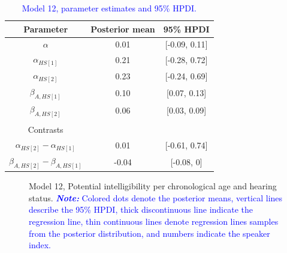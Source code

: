 \documentclass[
  authoryear,
  preprint,
  1p]{elsarticle}
\begin{document}
\begin{longtable}[]{@{}ccc@{}}

\caption{\label{tbl-parameter-model12}\textcolor{blue}{Model 12, parameter estimates and
95\% HPDI.}}

\tabularnewline

\toprule\noalign{}
Parameter & Posterior mean & 95\% HPDI \\
\midrule\noalign{}
\endhead
\bottomrule\noalign{}
\endlastfoot
\(\alpha\) & 0.01 & {[}-0.09, 0.11{]} \\
\(\alpha_{HS[1]}\) & 0.21 & {[}-0.28, 0.72{]} \\
\(\alpha_{HS[2]}\) & 0.23 & {[}-0.24, 0.69{]} \\
\(\beta_{A,HS[1]}\) & 0.10 & {[}0.07, 0.13{]} \\
\(\beta_{A,HS[2]}\) & 0.06 & {[}0.03, 0.09{]} \\
& & \\
Contrasts & & \\
\(\alpha_{HS[2]} - \alpha_{HS[1]}\) & 0.01 & {[}-0.61, 0.74{]} \\
\(\beta_{A,HS[2]} - \beta_{A,HS[1]}\) & -0.04 & {[}-0.08, 0{]} \\

\end{longtable}

\label{cell-fig-rq3-intelligibility-model12}
\begin{figure}[H]


\caption{\label{fig-rq3-intelligibility-model12}Model 12, Potential
intelligibility per chronological age and hearing status.
\textcolor{blue}{\textbf{\emph{Note:}} Colored dots denote the posterior means, vertical
lines describe the 95\% HPDI, thick discontinuous line indicate the
regression line, thin continuous lines denote regression lines samples
from the posterior distribution, and numbers indicate the speaker
index.}}

\end{figure}%
\end{document}
